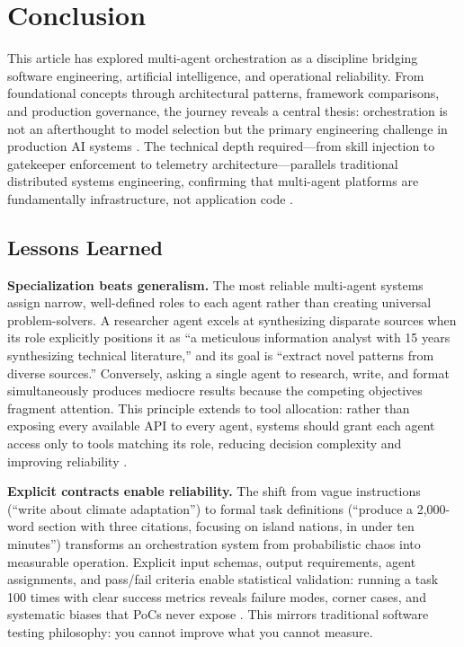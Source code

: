 \chapter{Conclusion}\label{ch:conclusion}

This article has explored multi-agent orchestration as a discipline bridging software engineering, artificial intelligence, and operational reliability. From foundational concepts through architectural patterns, framework comparisons, and production governance, the journey reveals a central thesis: orchestration is not an afterthought to model selection but the primary engineering challenge in production AI systems \cite{Segal2026}. The technical depth required—from skill injection to gatekeeper enforcement to telemetry architecture—parallels traditional distributed systems engineering, confirming that multi-agent platforms are fundamentally infrastructure, not application code \cite{CrewAI2024}.

\section{Lessons Learned}\label{sec:lessons}

\textbf{Specialization beats generalism.} The most reliable multi-agent systems assign narrow, well-defined roles to each agent rather than creating universal problem-solvers. A researcher agent excels at synthesizing disparate sources when its role explicitly positions it as ``a meticulous information analyst with 15 years synthesizing technical literature,'' and its goal is ``extract novel patterns from diverse sources.'' Conversely, asking a single agent to research, write, and format simultaneously produces mediocre results because the competing objectives fragment attention. This principle extends to tool allocation: rather than exposing every available API to every agent, systems should grant each agent access only to tools matching its role, reducing decision complexity and improving reliability \cite{Segal2026}.

\textbf{Explicit contracts enable reliability.} The shift from vague instructions (``write about climate adaptation'') to formal task definitions (``produce a 2,000-word section with three citations, focusing on island nations, in under ten minutes'') transforms an orchestration system from probabilistic chaos into measurable operation. Explicit input schemas, output requirements, agent assignments, and pass/fail criteria enable statistical validation: running a task 100 times with clear success metrics reveals failure modes, corner cases, and systematic biases that PoCs never expose \cite{CrewAI2024}. This mirrors traditional software testing philosophy: you cannot improve what you cannot measure.

